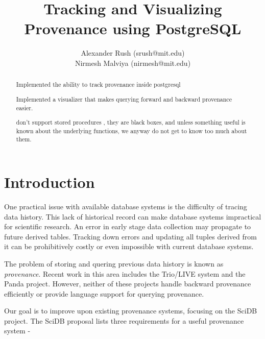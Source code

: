 \documentclass[11pt]{article}
\title{Tracking and Visualizing Provenance using PostgreSQL}
\author{Alexander Rush (srush@mit.edu)\\ Nirmesh Malviya (nirmesh@mit.edu)}
\begin{document}
\maketitle

\begin{abstract}

Implemented the ability to track provenance inside postgresql

Implemented a visualizer that makes querying forward and backward provenance easier.

don't support stored procedures , they are black boxes, and unless something useful is known about the underlying functions, we anyway do not get to know too much about them.
% 
\end{abstract}

\section{Introduction}

One practical issue with available database systems is the difficulty of tracing data history. This lack of historical record can make database systems impractical for scientific research. An error in early stage data collection may propagate to future derived tables. Tracking down errors and updating all tuples derived from it can be prohibitively costly or even impossible with current database systems. 

The problem of storing and quering previous data history is known as \emph{provenance}. Recent work in this area includes the Trio/LIVE system and the Panda project. However, neither of these projects handle backward provenance efficiently or provide language support for querying provenance.

Our goal is to improve upon existing provenance systems, focusing on the SciDB project. The SciDB proposal \cite{stonebraker9requirements} lists three requirements for a useful provenance system -
\end{document}
